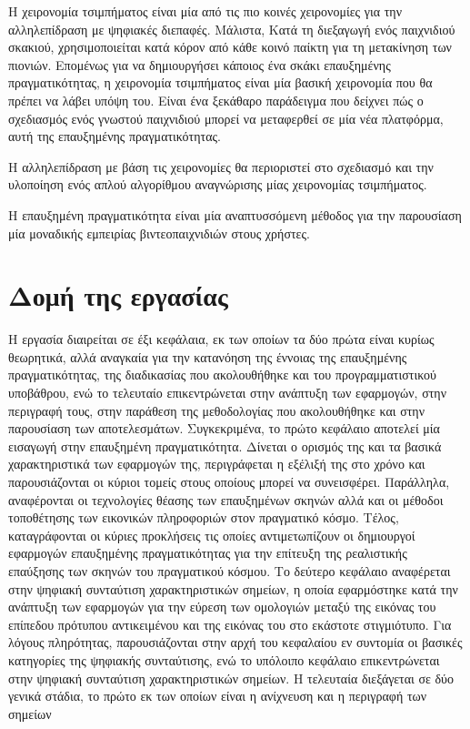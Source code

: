Η χειρονομία τσιμπήματος είναι μία από τις πιο κοινές χειρονομίες για την αλληλεπίδραση με ψηφιακές διεπαφές. Μάλιστα, Κατά τη διεξαγωγή ενός παιχνιδιού σκακιού, χρησιμοποιείται κατά κόρον από κάθε κοινό παίκτη για τη μετακίνηση των πιονιών. Επομένως για να δημιουργήσει κάποιος ένα σκάκι επαυξημένης πραγματικότητας, η χειρονομία τσιμπήματος είναι μία βασική χειρονομία που θα πρέπει να λάβει υπόψη του. Είναι ένα ξεκάθαρο παράδειγμα που δείχνει πώς ο σχεδιασμός ενός γνωστού παιχνιδιού μπορεί να μεταφερθεί σε μία νέα πλατφόρμα, αυτή της επαυξημένης πραγματικότητας.

Η αλληλεπίδραση με βάση τις χειρονομίες θα περιοριστεί στο σχεδιασμό και την υλοποίηση ενός απλού αλγορίθμου αναγνώρισης μίας χειρονομίας τσιμπήματος.

Η επαυξημένη πραγματικότητα είναι μία αναπτυσσόμενη μέθοδος για την παρουσίαση μία μοναδικής εμπειρίας βιντεοπαιχνιδιών στους χρήστες.




\section{Δομή της εργασίας}
Η εργασία διαιρείται σε έξι κεφάλαια, εκ των οποίων τα δύο πρώτα είναι κυρίως θεωρητικά, αλλά αναγκαία για την κατανόηση της έννοιας της επαυξημένης πραγματικότητας, της διαδικασίας που ακολουθήθηκε και του προγραμματιστικού υποβάθρου, ενώ το τελευταίο επικεντρώνεται στην ανάπτυξη των εφαρμογών, στην περιγραφή τους, στην παράθεση της μεθοδολογίας που ακολουθήθηκε και στην παρουσίαση των αποτελεσμάτων.
Συγκεκριμένα, το πρώτο κεφάλαιο αποτελεί μία εισαγωγή στην επαυξημένη πραγματικότητα.
Δίνεται ο ορισμός της και τα βασικά χαρακτηριστικά των εφαρμογών της, περιγράφεται η εξέλιξή της στο χρόνο και παρουσιάζονται οι κύριοι τομείς στους οποίους μπορεί να συνεισφέρει. Παράλληλα, αναφέρονται οι τεχνολογίες θέασης των επαυξημένων σκηνών αλλά και οι μέθοδοι τοποθέτησης των εικονικών πληροφοριών στον πραγματικό κόσμο. Τέλος, καταγράφονται οι κύριες προκλήσεις τις οποίες αντιμετωπίζουν οι δημιουργοί εφαρμογών επαυξημένης πραγματικότητας για την επίτευξη της ρεαλιστικής επαύξησης των σκηνών του πραγματικού κόσμου.
Το δεύτερο κεφάλαιο αναφέρεται στην ψηφιακή συνταύτιση χαρακτηριστικών σημείων, η οποία εφαρμόστηκε κατά την ανάπτυξη των εφαρμογών για την εύρεση των ομολογιών μεταξύ της εικόνας του επίπεδου πρότυπου αντικειμένου και της εικόνας του στο εκάστοτε στιγμιότυπο. Για λόγους πληρότητας, παρουσιάζονται στην αρχή του κεφαλαίου εν συντομία οι βασικές κατηγορίες της ψηφιακής συνταύτισης, ενώ το υπόλοιπο κεφάλαιο επικεντρώνεται στην ψηφιακή συνταύτιση χαρακτηριστικών σημείων. Η τελευταία διεξάγεται σε δύο γενικά στάδια, το πρώτο εκ των οποίων είναι η ανίχνευση και η περιγραφή των σημείων

